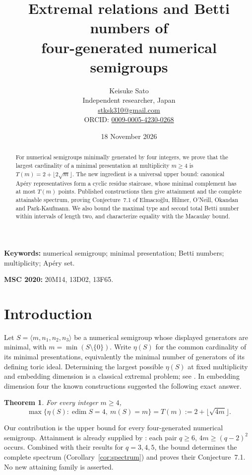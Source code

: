 \documentclass[11pt]{article}
\title{Extremal relations and Betti numbers of\\four-generated numerical semigroups}
\author{Keisuke Sato\\Independent researcher, Japan\\
\href{mailto:stksk310@gmail.com}{stksk310@gmail.com}\\
ORCID: \href{https://orcid.org/0009-0005-4230-0268}{0009-0005-4230-0268}}
\date{18 November 2026}
\newtheorem{theorem}{Theorem}[section]
\DeclareMathOperator{\edim}{edim}
\begin{document}
\maketitle
\begin{abstract}
For numerical semigroups minimally generated by four integers, we prove that
the largest cardinality of a minimal presentation at multiplicity $m\ge4$ is
$T(m)=2+\lfloor2\sqrt m\rfloor$.
The new ingredient is a universal upper bound: canonical Ap\'ery
representatives form a cyclic residue staircase, whose minimal complement
has at most $T(m)$ points. Published constructions then give attainment
and the complete attainable spectrum, proving Conjecture~7.1 of
Elmac\i{}o\u{g}lu, Hilmer, O'Neill, Okandan and Park-Kaufmann.
We also bound the maximal type and second total Betti number within
intervals of length two, and characterize equality with the Macaulay bound.
\end{abstract}
\noindent\textbf{Keywords:} numerical semigroup; minimal presentation;
Betti numbers; multiplicity; Ap\'ery set.\par
\smallskip
\noindent\textbf{MSC 2020:} 20M14, 13D02, 13F65.

\section{Introduction}
Let $S=\langle m,n_1,n_2,n_3\rangle$ be a numerical semigroup whose
displayed generators are minimal, with $m=\min(S\setminus\{0\})$.
Write $\eta(S)$ for the common cardinality of its minimal presentations,
equivalently the minimal number of generators of its defining toric ideal.
Determining the largest possible $\eta(S)$ at fixed multiplicity and
embedding dimension is a classical extremal problem; see
\cite{MS25,MSSurvey25}. In embedding dimension four the known
constructions suggested the following exact answer.

\begin{theorem}\label{thm:main}
For every integer $m\ge4$,
\[
\max\{\eta(S):\edim S=4,\ m(S)=m\}
=T(m):=2+\lfloor\sqrt{4m}\rfloor.
\]
\end{theorem}

Our contribution is the upper bound for every four-generated numerical
semigroup. Attainment is already supplied by
\cite[Theorem~6.3]{EHOOPK24}: each pair $q\ge6$, $4m\ge(q-2)^2$
occurs. Combined with their results for $q=3,4,5$, the bound determines
the complete spectrum (Corollary~\ref{cor:spectrum}) and proves their
Conjecture~7.1. No new attaining family is asserted.
\end{document}
